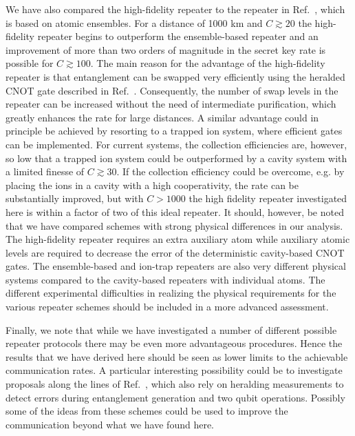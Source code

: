 We have also compared the high-fidelity repeater to the repeater in
Ref.~\cite{sangouard1}, which is based on atomic ensembles. For a distance of
1000 km and $C\gtrsim20$ the high-fidelity repeater begins to outperform the
ensemble-based repeater and an improvement of more than two orders of magnitude
in the secret key rate is possible for $C\gtrsim100$. The main reason for the
advantage of the high-fidelity repeater is that entanglement can be swapped very
efficiently using the heralded CNOT gate described in Ref.~\cite{Borregaard2015a}.
Consequently, the number of swap levels in the repeater can be increased without
the need of intermediate purification, which greatly enhances the rate for large
distances. A similar advantage could in principle be achieved by resorting to a
trapped ion system, where efficient gates can be implemented. For current
systems, the collection efficiencies are, however, so low that a trapped ion
system could be outperformed by a cavity system with a limited finesse of
$C\gtrsim 30$. If the collection efficiency could be overcome, e.g. by placing
the ions in a cavity with a high cooperativity, the rate can be substantially
improved, but with $C>1000$ the high fidelity repeater investigated here is
within a factor of two of this ideal repeater. It should, however, be noted that
we have compared schemes with strong physical differences in our analysis. The
high-fidelity repeater requires an extra auxiliary atom while auxiliary atomic
levels are required to decrease the error of the deterministic cavity-based CNOT
gates. The ensemble-based and ion-trap repeaters are also very different
physical systems compared to the cavity-based repeaters with individual atoms.
The different experimental difficulties in realizing the physical requirements
for the various repeater schemes should be included in a more advanced
assessment.

Finally, we note that while we have investigated a number of different possible
repeater protocols there may be even more advantageous procedures. Hence the
results that we have derived here should be seen as lower limits to the
achievable communication rates. A particular interesting  possibility could be
to investigate proposals along the lines of Ref.~\cite{cirac1,cirac2}, which
also rely on heralding measurements to detect errors during entanglement
generation and two qubit operations.  Possibly some of the ideas from these
schemes could be used to improve the communication beyond what we have found
here.
